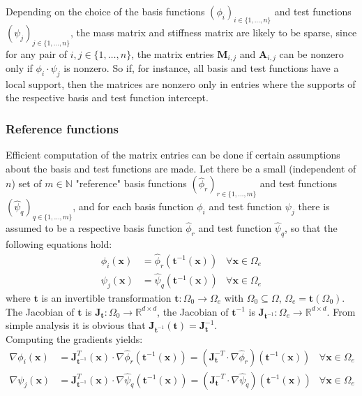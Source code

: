 \documentclass{IOS-Book-Article}
\theoremstyle{plain}
\theoremstyle{definition}
\begin{document}
Depending on the choice of the basis functions $(\phi_i)_{i \in \{1, \dots , n\}}$ and test functions $(\psi_j)_{j \in \{1, \dots , n\}}$, the mass matrix and stiffness matrix are likely to be sparse, since for any pair of $i, j \in \{1, \dots , n\}$, the matrix entries $\mathbf M_{i, j}$ and $\mathbf A_ {i, j}$ can be nonzero only if $\phi_i \cdot \psi_j$ is nonzero. So if, for instance, all basis and test functions have a local support, then  the matrices are nonzero only in entries where the supports of the respective basis and test function intercept.\\

\subsubsection{Reference functions}

Efficient computation of the matrix entries can be done if certain assumptions about the basis and test functions are made. Let there be a small (independent of $n$) set of $m \in \mathbb{N}$ "reference" basis functions $(\hat \phi_r)_{r \in \{1, \dots , m\}}$ and test functions $(\hat \psi_q)_{q \in \{1, \dots , m\}}$, and for each basis function $\phi_i$ and test function $\psi_j$ there is assumed to be a respective basis function $\hat \phi_r$ and test function $\hat \psi_q$, so that the following equations hold:
\begin{align}
	\phi_i(\mathbf x) &= \hat \phi_r(\mathbf t^{-1} (\mathbf x)) & \forall \mathbf x \in \Omega_e \\
	\psi_j(\mathbf x) &= \hat \psi_q(\mathbf t^{-1} (\mathbf x)) & \forall \mathbf x \in \Omega_e
\end{align}
where $\mathbf{t}$ is an invertible transformation $\mathbf{t}: \Omega_0 \rightarrow \Omega_e$ with $\Omega_0 \subseteq \Omega$, $\Omega_e = \mathbf{t}(\Omega_0)$. The Jacobian of $\mathbf t$ is $\mathbf J_{\mathbf t}: \Omega_0 \rightarrow \mathbb{R}^{d \times d}$, the Jacobian of $\mathbf t^{-1}$ is $\mathbf J_{\mathbf t^{-1}}: \Omega_e \rightarrow \mathbb{R}^{d \times d}$. From simple analysis it is obvious that $\mathbf J_{\mathbf t^{-1}} (\mathbf t) = \mathbf J^{-1}_{\mathbf t}$.\\
Computing the gradients yields:
\begin{align*}
	\nabla \phi_i(\mathbf x) &= \mathbf J_{\mathbf t^{-1}}^T(\mathbf x) \cdot \nabla \hat \phi_r(\mathbf t^{-1} (\mathbf x)) = (\mathbf J_{\mathbf t}^{-T} \cdot \nabla \hat \phi_r)(\mathbf t^{-1} (\mathbf x)) & \forall \mathbf x \in \Omega_e \\
	\nabla \psi_j(\mathbf x) &= \mathbf J_{\mathbf t^{-1}}^T(\mathbf x) \cdot \nabla \hat \psi_q(\mathbf t^{-1} (\mathbf x)) = (\mathbf J_{\mathbf t}^{-T} \cdot \nabla \hat \psi_q)(\mathbf t^{-1} (\mathbf x)) & \forall \mathbf x \in \Omega_e
\end{align*}
\end{document}
